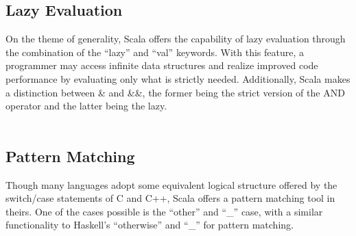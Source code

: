 \documentclass[12pt]{report}
\begin{document}
\subsection*{Lazy Evaluation} 
On the theme of generality, Scala offers the capability of lazy evaluation through the combination of the “lazy” and “val” keywords. With this feature, a programmer may access infinite data structures and realize improved code performance by evaluating only what is strictly needed. Additionally, Scala makes a distinction between \& and \&\&, the former being the strict version of the AND operator and the latter being the lazy. \\
\\  

\subsection*{Pattern Matching} 
Though many languages adopt some equivalent logical structure offered by the switch/case statements of C and C++, Scala offers a pattern matching tool in theirs. One of the cases possible is the “other” and “\_” case, with a similar functionality to Haskell’s “otherwise” and “\_” for pattern matching.\\
\\  
\end{document}
